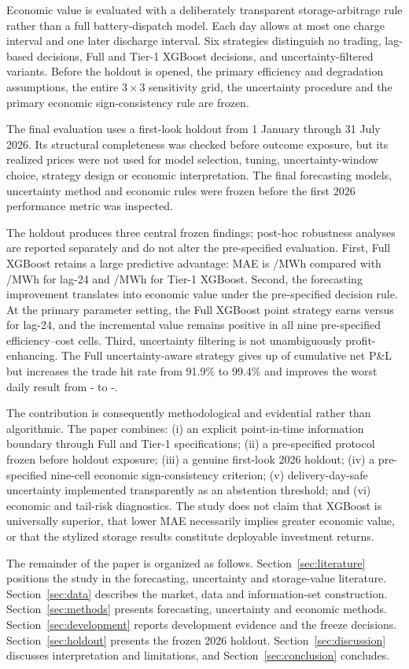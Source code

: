 Economic value is evaluated with a deliberately transparent storage-arbitrage rule rather than a full battery-dispatch model. Each day allows at most one charge interval and one later discharge interval. Six strategies distinguish no trading, lag-based decisions, Full and Tier-1 XGBoost decisions, and uncertainty-filtered variants. Before the holdout is opened, the primary efficiency and degradation assumptions, the entire \(3\times3\) sensitivity grid, the uncertainty procedure and the primary economic sign-consistency rule are frozen.

The final evaluation uses a first-look holdout from 1 January through 31 July 2026. Its structural completeness was checked before outcome exposure, but its realized prices were not used for model selection, tuning, uncertainty-window choice, strategy design or economic interpretation. The final forecasting models, uncertainty method and economic rules were frozen before the first 2026 performance metric was inspected.

The holdout produces three central frozen findings; post-hoc robustness analyses are reported separately and do not alter the pre-specified evaluation. First, Full XGBoost retains a large predictive advantage: MAE is /MWh compared with /MWh for lag-24 and /MWh for Tier-1 XGBoost. Second, the forecasting improvement translates into economic value under the pre-specified decision rule. At the primary parameter setting, the Full XGBoost point strategy earns  versus  for lag-24, and the incremental value remains positive in all nine pre-specified efficiency--cost cells. Third, uncertainty filtering is not unambiguously profit-enhancing. The Full uncertainty-aware strategy gives up  of cumulative net P\&L but increases the trade hit rate from 91.9\% to 99.4\% and improves the worst daily result from - to -.

The contribution is consequently methodological and evidential rather than algorithmic. The paper combines: (i) an explicit point-in-time information boundary through Full and Tier-1 specifications; (ii) a pre-specified protocol frozen before holdout exposure; (iii) a genuine first-look 2026 holdout; (iv) a pre-specified nine-cell economic sign-consistency criterion; (v) delivery-day-safe uncertainty implemented transparently as an abstention threshold; and (vi) economic and tail-risk diagnostics. The study does not claim that XGBoost is universally superior, that lower MAE necessarily implies greater economic value, or that the stylized storage results constitute deployable investment returns.

The remainder of the paper is organized as follows. Section~\ref{sec:literature} positions the study in the forecasting, uncertainty and storage-value literature. Section~\ref{sec:data} describes the market, data and information-set construction. Section~\ref{sec:methods} presents forecasting, uncertainty and economic methods. Section~\ref{sec:development} reports development evidence and the freeze decisions. Section~\ref{sec:holdout} presents the frozen 2026 holdout. Section~\ref{sec:discussion} discusses interpretation and limitations, and Section~\ref{sec:conclusion} concludes.

